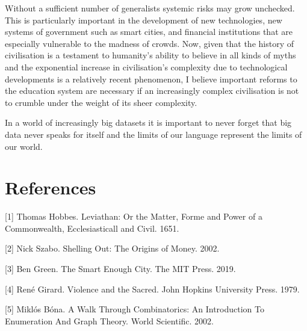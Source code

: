 \documentclass{article}
\begin{document}
Without a sufficient number of generalists systemic risks may grow unchecked. This is particularly important in the
development of new technologies, new systems of government such as smart cities, and financial
institutions that are especially vulnerable to the madness of crowds. Now, given that the history of civilisation is a testament to humanity's ability to believe in all
kinds of myths and the exponential increase in civilisation's complexity due to technological
developments is a relatively recent phenomenon, I believe important reforms to the education
system are necessary if an increasingly complex civilisation is not to crumble under the
weight of its sheer complexity. 

In a world of increasingly big datasets it is important to never forget that big data never speaks for itself and the limits of our language represent the limits of our world. 

\section*{References}

\small

[1] Thomas Hobbes. Leviathan: Or the Matter, Forme and Power of a Commonwealth, Ecclesiasticall and Civil. 1651.

[2] Nick Szabo. Shelling Out: The Origins of Money. 2002.

[3] Ben Green. The Smart Enough City. The MIT Press. 2019.

[4] René Girard. Violence and the Sacred. John Hopkins University Press. 1979.

[5] Miklós Bóna. A Walk Through Combinatorics: An Introduction To Enumeration And Graph Theory. World Scientific. 2002.   
\end{document}
